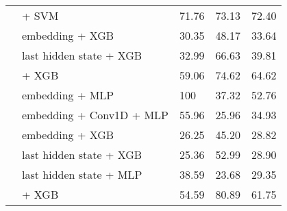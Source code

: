 \begin{table*}[ht]
\begin{tabular}{@{}llp{1.1cm}p{1.1cm}p{1.1cm}@{}}
                                           & \citep{zhang2025jasperstelladistillationsota} + SVM                & 71.76                           & 73.13                              & 72.40                             \\
                                           & \citep{DBLP:journals/corr/abs-1907-11692} embedding + XGB          & 30.35                           & 48.17                              & 33.64                             \\
                                           & \citep{DBLP:journals/corr/abs-1907-11692} last hidden state + XGB  & 32.99                           & 66.63                              & 39.81                             \\
                                           & \citep{ni2021sentencet5scalablesentenceencoders} + XGB             & 59.06                           & 74.62                              & 64.62                             \\
                                           & \citep{DBLP:journals/corr/abs-1911-02116} embedding + MLP          & 100                             & 37.32                              & 52.76                             \\
                                           & \citep{DBLP:journals/corr/abs-1911-02116} embedding + Conv1D + MLP & 55.96                           & 25.96                              & 34.93                             \\
                                           & \citep{DBLP:journals/corr/abs-1911-02116} embedding + XGB          & 26.25                           & 45.20                              & 28.82                             \\
                                           & \citep{DBLP:journals/corr/abs-1911-02116} last hidden state + XGB  & 25.36                           & 52.99                              & 28.90                             \\
                                           & \citep{DBLP:journals/corr/abs-1911-02116} last hidden state + MLP  & 38.59                           & 23.68                              & 29.35                             \\
                                           & \citep{lee2024nv} + XGB                                            & 54.59                           & 80.89                              & 61.75                             \\

\end{tabular}
\end{table*}
